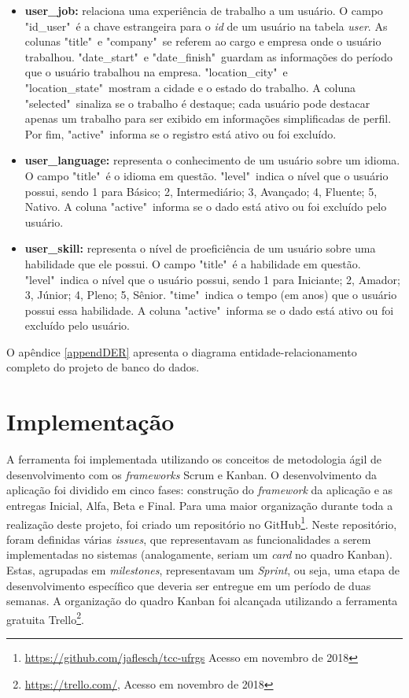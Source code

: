 \begin{itemize}
    \item \textbf{user\_job:} relaciona uma experiência de trabalho a um usuário. O campo "id\_user"\ é a chave estrangeira para o \textit{id} de um usuário na tabela \textit{user}. As colunas "title"\ e "company"\ se referem ao cargo e empresa onde o  usuário trabalhou. "date\_start"\ e "date\_finish"\ guardam as informações do período que o usuário trabalhou na empresa. "location\_city"\ e "location\_state"\ mostram a cidade e o estado do trabalho. A coluna "selected"\ sinaliza se o trabalho é destaque; cada usuário pode destacar apenas um trabalho para ser exibido em informações simplificadas de perfil. Por fim, "active"\ informa se o registro está ativo ou foi excluído.
    
    \item \textbf{user\_language:} representa o conhecimento de um usuário sobre um idioma. O campo "title"\ é o idioma em questão. "level"\ indica o nível que o usuário possui, sendo 1 para Básico; 2, Intermediário; 3, Avançado; 4, Fluente; 5, Nativo. A coluna "active"\ informa se o dado está ativo ou foi excluído pelo usuário.
    
    \item \textbf{user\_skill:} representa o nível de proeficiência de um usuário sobre uma habilidade que ele possui. O campo "title"\ é a habilidade em questão. "level"\ indica o nível que o usuário possui, sendo 1 para Iniciante; 2, Amador; 3, Júnior; 4, Pleno; 5, Sênior. "time"\ indica o tempo (em anos) que o usuário possui essa habilidade. A coluna "active"\ informa se o dado está ativo ou foi excluído pelo usuário.
    
\end{itemize}

O apêndice \ref{appendDER} apresenta o diagrama entidade-relacionamento completo do projeto de banco do dados.

\section{Implementação}
\label{metodologiaImplementação}

A ferramenta foi implementada utilizando os conceitos de metodologia ágil de desenvolvimento com os \textit{frameworks} Scrum e Kanban. O desenvolvimento da aplicação foi dividido em cinco fases: construção do \textit{framework} da aplicação e  as entregas Inicial, Alfa, Beta e Final. Para uma maior organização durante toda a realização deste projeto, foi criado um repositório no GitHub\footnote{\url{https://github.com/jaflesch/tcc-ufrgs} Acesso em novembro de 2018}. Neste repositório, foram definidas várias \textit{issues}, que representavam as funcionalidades a serem implementadas no sistemas (analogamente, seriam um \textit{card} no quadro Kanban). Estas, agrupadas em \textit{milestones}, representavam um \textit{Sprint}, ou seja, uma etapa de desenvolvimento específico que deveria ser entregue em um período de duas semanas. A organização do quadro Kanban foi alcançada utilizando a ferramenta gratuita Trello\footnote{\url{https://trello.com/}, Acesso em novembro de 2018}.

